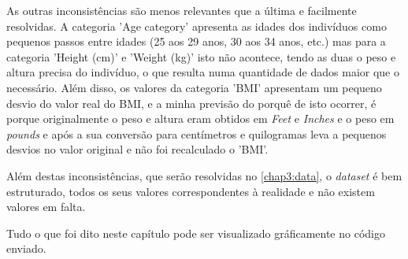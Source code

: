 As outras inconsistências são menos relevantes que a última e facilmente resolvidas. A categoria 'Age category' apresenta as idades dos indivíduos como pequenos passos entre idades (25 aos 29 anos, 30 aos 34 anos, etc.) mas para a categoria 'Height (cm)' e 'Weight (kg)' isto não acontece, tendo as duas o peso e altura precisa do indivíduo, o que resulta numa quantidade de dados maior que o necessário. Além disso, os valores da categoria 'BMI' apresentam um pequeno desvio do valor real do BMI, e a minha previsão do porquê de isto ocorrer, é porque originalmente o peso e altura eram obtidos em \textit{Feet} e \textit{Inches} e o peso em \textit{pounds} e após a sua conversão para centímetros e quilogramas leva a pequenos desvios no valor original e não foi recalculado o 'BMI'. 

Além destas inconsistências, que serão resolvidas no \ref{chap3:data}, o \textit{dataset} é bem estruturado, todos os seus valores correspondentes à realidade e não existem valores em falta.

Tudo o que foi dito neste capítulo pode ser visualizado gráficamente no código enviado.



